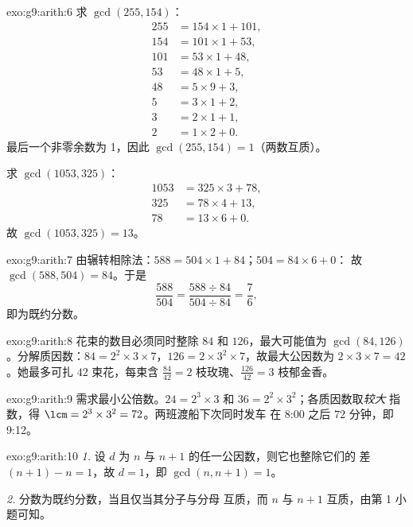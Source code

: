 \begin{solution}{exo:g9:arith:6}
求 $\gcd(255, 154)$：
\begin{align*}
255 &= 154 \times 1 + 101, \\
154 &= 101 \times 1 + 53, \\
101 &= 53 \times 1 + 48, \\
53 &= 48 \times 1 + 5, \\
48 &= 5 \times 9 + 3, \\
5 &= 3 \times 1 + 2, \\
3 &= 2 \times 1 + 1, \\
2 &= 1 \times 2 + 0 .
\end{align*}
最后一个非零余数为 1，因此 $\gcd(255, 154) = 1$（两数互质）。

求 $\gcd(1053, 325)$：
\begin{align*}
1053 &= 325 \times 3 + 78, \\
325 &= 78 \times 4 + 13, \\
78 &= 13 \times 6 + 0 .
\end{align*}
故 $\gcd(1053, 325) = 13$。
\end{solution}

\begin{solution}{exo:g9:arith:7}
由辗转相除法：$588 = 504 \times 1 + 84$；$504 = 84 \times 6 + 0$：
故 $\gcd(588, 504) = 84$。于是
\[
\frac{588}{504} = \frac{588 \div 84}{504 \div 84} = \frac{7}{6},
\]
即为既约分数。
\end{solution}

\begin{solution}{exo:g9:arith:8}
花束的数目必须同时整除 $84$ 和 $126$，最大可能值为
$\gcd(84, 126)$。分解质因数：$84 = 2^2 \times 3 \times
7$，$126 = 2 \times 3^2 \times 7$，故最大公因数为 $2 \times 3 \times 7 =
42$。她最多可扎 $42$ 束花，每束含
$\frac{84}{42} = 2$ 枝玫瑰、$\frac{126}{42} = 3$ 枝郁金香。
\end{solution}

\begin{solution}{exo:g9:arith:9}
需求最小公倍数。$24 = 2^3 \times 3$ 和
$36 = 2^2 \times 3^2$；各质因数取\emph{较大}
指数，得 $\lcm = 2^3 \times 3^2 = 72$。两班渡船下次同时发车
在 8:00 之后 $72$ 分钟，即 9:12。
\end{solution}

\begin{solution}{exo:g9:arith:10}
\emph{1.} 设 $d$ 为 $n$ 与 $n+1$ 的任一公因数，则它也整除它们的
差 $(n+1) - n = 1$，故 $d = 1$，即 $\gcd(n, n+1) = 1$。

\emph{2.} 分数为既约分数，当且仅当其分子与分母
互质，而 $n$ 与 $n + 1$ 互质，由第
1 小题可知。
\end{solution}

